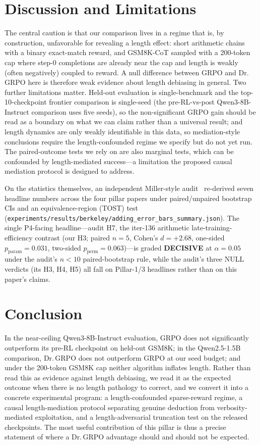 \documentclass{article}
\begin{document}
 \section{Discussion and Limitations}
\label{sec:p4-discussion}
The central caution is that our comparison lives in a regime that is, by
construction, unfavorable for revealing a length effect: short arithmetic chains
with a binary exact-match reward, and GSM8K-CoT sampled with a 200-token cap where
step-0 completions are already near the cap and length is weakly (often
negatively) coupled to reward. A null difference between GRPO and
Dr.\,GRPO here is therefore weak evidence about length debiasing in general. Two
further limitations matter. Held-out evaluation is single-benchmark and
the top-10-checkpoint frontier comparison is single-seed (the pre-RL-vs-post
Qwen3-8B-Instruct comparison uses five seeds), so the non-significant GRPO gain
should be read as a boundary on what we can claim rather than a universal result;
and length
dynamics are only weakly identifiable in this data, so mediation-style conclusions
require the length-confounded regime we specify but do not yet run. The
paired-outcome tests we rely on are also marginal tests, which can be confounded by
length-mediated success---a limitation the proposed causal mediation protocol is
designed to address.

On the statistics themselves, an independent Miller-style
audit~\citep{miller2024erroreval} re-derived seven headline numbers across the four
pillar papers under paired/unpaired bootstrap CIs and an equivalence-region (TOST)
test (\texttt{experiments/results/berkeley/adding\_error\_bars\_summary.json}).
The single P4-facing headline---audit H7, the iter-136 arithmetic late-training-efficiency
contrast (our H3; paired $n{=}5$, Cohen's $d = +2.68$,
one-sided $p_{\mathrm{param}} = 0.031$, two-sided $p_{\mathrm{perm}} = 0.063$)---is
graded \textbf{DECISIVE} at $\alpha = 0.05$ under the audit's $n{<}10$
paired-bootstrap rule, while the audit's three NULL verdicts (its H3, H4, H5) all
fall on Pillar-1/3 headlines rather than on this paper's claims.

\section{Conclusion}
\label{sec:p4-conclusion}
In the near-ceiling Qwen3-8B-Instruct evaluation, GRPO does not significantly
outperform its pre-RL checkpoint on held-out GSM8K; in the Qwen2.5-1.5B
comparison, Dr.\,GRPO does not outperform GRPO at our seed budget; and under the
200-token GSM8K cap neither algorithm inflates length. Rather than read this as
evidence against length debiasing, we
read it as the expected outcome when there is no length pathology to correct, and
we convert it into a concrete experimental program: a length-confounded sparse-reward
regime, a causal length-mediation protocol separating genuine deduction from
verbosity-mediated exploitation, and a length-adversarial truncation test on the
released checkpoints. The most useful contribution of this pillar is thus a precise
statement of where a Dr.\,GRPO advantage should and should not be expected.
 

\end{document}
